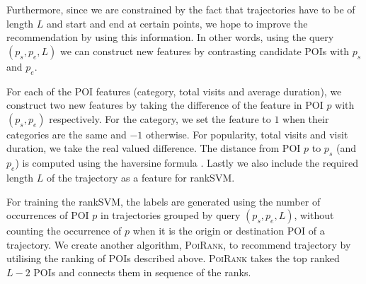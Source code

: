 Furthermore, since we are constrained by the fact that trajectories have to be of length $L$ and start and end at certain points, we hope to improve the recommendation by using this information.
In other words, using the query $(p_s, p_e, L)$ we can construct new features by contrasting
candidate POIs with $p_s$ and $p_e$.

For each of the POI features (category, total visits and average duration),
we construct two new features by taking the difference of
the feature in POI $p$ with $(p_s, p_e)$ respectively.
For the category, we set the feature to $1$ when their categories are the same and $-1$ otherwise.
For popularity, total visits and visit duration, we take the real valued difference.
The distance from POI $p$ to $p_s$ (and $p_e$) is computed using the haversine formula \cite{haversine}.
Lastly we also include the required length $L$ of the trajectory as a feature for rankSVM.

For training the rankSVM, the labels are generated using the number of occurrences of
POI $p$ in trajectories grouped by query $(p_s, p_e, L)$,
without counting the occurrence of $p$ when it is the origin or destination POI of a trajectory.
We create another algorithm, \textsc{PoiRank}, to recommend trajectory by utilising
the ranking of POIs described above. \textsc{PoiRank} takes the top ranked $L-2$ POIs
and connects them in sequence of the ranks.



